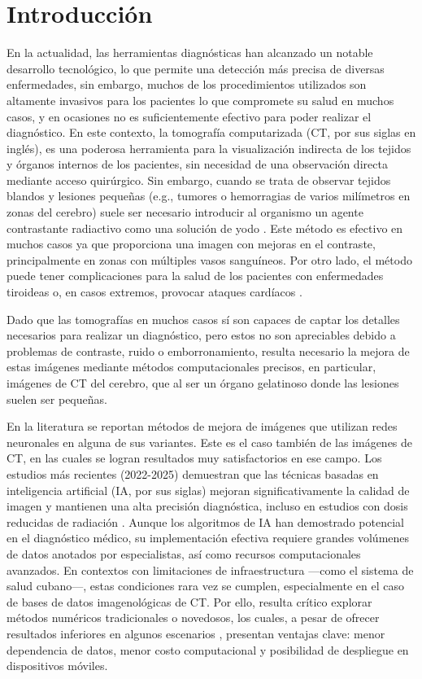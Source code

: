 \chapter*{Introducción}\label{chapter:introduction}
En la actualidad, las herramientas diagnósticas han alcanzado un notable desarrollo tecnológico, lo que permite una detección más precisa de diversas enfermedades, sin embargo, muchos de los procedimientos utilizados son altamente invasivos para los pacientes lo que compromete su salud en muchos casos, y en ocasiones no es suficientemente efectivo para poder realizar el diagnóstico. En este contexto, la tomografía computarizada (CT, por sus siglas en inglés), es una poderosa herramienta para la visualización indirecta de los tejidos y órganos internos de los pacientes, sin necesidad de una observación directa mediante acceso quirúrgico. Sin embargo, cuando se trata de observar tejidos blandos y lesiones pequeñas (e.g., tumores o hemorragias de varios milímetros en zonas del cerebro) suele ser necesario introducir al organismo un agente contrastante radiactivo como una solución de yodo \cite{InsideRadiologyICCM}. Este método es efectivo en muchos casos ya que proporciona una imagen con mejoras en el contraste, principalmente en zonas con múltiples vasos sanguíneos. Por otro lado, el método puede tener complicaciones para la salud de los pacientes con enfermedades tiroideas o, en casos extremos, provocar ataques cardíacos \cite{IodineTyroids,IodineHeathAttack}.

Dado que las tomografías en muchos casos sí son capaces de captar los detalles necesarios para realizar un diagnóstico, pero estos no son apreciables debido a problemas de contraste, ruido o emborronamiento, resulta necesario la mejora de estas imágenes mediante métodos computacionales precisos, en particular, imágenes de CT del cerebro, que al ser un órgano gelatinoso donde las lesiones suelen ser pequeñas. 

En la literatura se reportan métodos de mejora de imágenes que utilizan redes neuronales en alguna de sus variantes. Este es el caso también de las imágenes de CT, en las cuales se logran resultados muy satisfactorios en ese campo. Los estudios más recientes (2022-2025) demuestran que las técnicas basadas en inteligencia artificial (IA, por sus siglas) mejoran significativamente la calidad de imagen y mantienen una alta precisión diagnóstica, incluso en estudios con dosis reducidas de radiación \cite{AISurveyOnImageQuality}. Aunque los algoritmos de IA han demostrado potencial en el diagnóstico médico, su implementación efectiva requiere grandes volúmenes de datos anotados por especialistas, así como recursos computacionales avanzados. En contextos con limitaciones de infraestructura —como el sistema de salud cubano—, estas condiciones rara vez se cumplen, especialmente en el caso de bases de datos imagenológicas de CT. Por ello, resulta crítico explorar métodos numéricos tradicionales o novedosos, los cuales, a pesar de ofrecer resultados inferiores en algunos escenarios , presentan ventajas clave: menor dependencia de datos, menor costo computacional y posibilidad de despliegue en dispositivos móviles.

